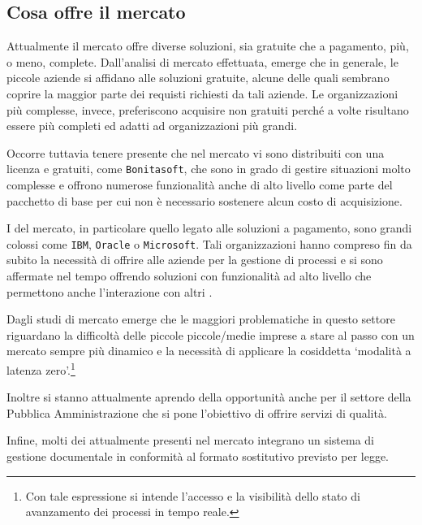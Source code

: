 \subsection{Cosa offre il mercato}
Attualmente il mercato offre diverse soluzioni, sia gratuite che a pagamento, più, o meno, complete.	
Dall'analisi di mercato effettuata, emerge che in generale, le piccole aziende si affidano alle soluzioni gratuite, alcune delle quali sembrano coprire la maggior parte dei requisti richiesti da tali aziende. Le organizzazioni più complesse, invece, preferiscono acquisire \sw non gratuiti perché a volte risultano essere più completi ed adatti ad organizzazioni più grandi.

Occorre tuttavia tenere presente che nel mercato vi sono \sw distribuiti con una licenza  e gratuiti, come \texttt{Bonitasoft}, che sono in grado di gestire situazioni molto complesse e offrono numerose funzionalità anche di alto livello come parte del pacchetto di base per cui non è necessario sostenere alcun costo di acquisizione.
 
I  del mercato, in particolare quello legato alle soluzioni \sw a pagamento, sono grandi colossi come \texttt{IBM}, \texttt{Oracle} o \texttt{Microsoft}. Tali organizzazioni hanno compreso fin da subito la necessità di offrire alle aziende \sw per la gestione di processi e si sono affermate nel tempo offrendo soluzioni con funzionalità ad alto livello che permettono anche l'interazione con altri \sw.

Dagli studi di mercato emerge che le maggiori problematiche in questo settore riguardano la difficoltà delle piccole piccole/medie imprese a stare al passo con un mercato sempre più dinamico e la necessità di applicare la cosiddetta `modalità a latenza zero'.\footnote{Con tale espressione si intende l'accesso e la visibilità dello stato di avanzamento dei processi in tempo reale.}

Inoltre si stanno attualmente aprendo della opportunità anche per il settore della Pubblica Amministrazione che si pone l'obiettivo di offrire servizi di qualità.

Infine, molti dei \sw attualmente presenti nel mercato integrano un sistema di gestione documentale in conformità al formato sostitutivo previsto per legge.



